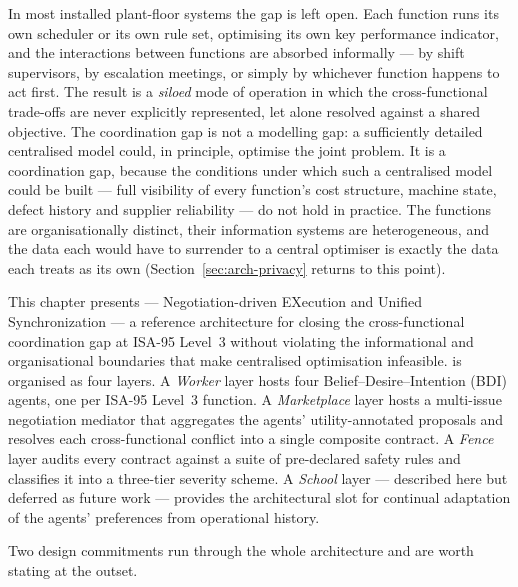 In most installed plant-floor systems the gap is left open. Each
function runs its own scheduler or its own rule set, optimising its own
key performance indicator, and the interactions between functions are
absorbed informally --- by shift supervisors, by escalation meetings,
or simply by whichever function happens to act first. The result is a
\emph{siloed} mode of operation in which the cross-functional
trade-offs are never explicitly represented, let alone resolved against
a shared objective. The coordination gap is not a modelling gap: a
sufficiently detailed centralised model could, in principle, optimise
the joint problem. It is a coordination gap, because the conditions
under which such a centralised model could be built --- full visibility
of every function's cost structure, machine state, defect history and
supplier reliability --- do not hold in practice. The functions are
organisationally distinct, their information systems are heterogeneous,
and the data each would have to surrender to a central optimiser is
exactly the data each treats as its own (Section~\ref{sec:arch-privacy}
returns to this point).

This chapter presents \NEXUS{} --- Negotiation-driven EXecution and
Unified Synchronization --- a reference architecture for closing the
cross-functional coordination gap at ISA-95 Level~3 without violating
the informational and organisational boundaries that make centralised
optimisation infeasible. \NEXUS{} is organised as four layers. A
\emph{Worker} layer hosts four Belief--Desire--Intention (BDI) agents,
one per ISA-95 Level~3 function. A \emph{Marketplace} layer hosts a
multi-issue negotiation mediator that aggregates the agents'
utility-annotated proposals and resolves each cross-functional conflict
into a single composite contract. A \emph{Fence} layer audits every
contract against a suite of pre-declared safety rules and classifies it
into a three-tier severity scheme. A \emph{School} layer --- described
here but deferred as future work --- provides the architectural slot
for continual adaptation of the agents' preferences from operational
history.

Two design commitments run through the whole architecture and are
worth stating at the outset.

